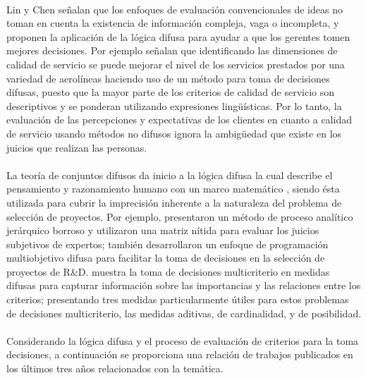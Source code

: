 \\
Lin y Chen señalan que los enfoques de evaluación convencionales de ideas no toman en cuenta la existencia de información compleja, vaga o incompleta, y proponen la aplicación de la lógica difusa para ayudar a que los gerentes tomen mejores decisiones. Por ejemplo \citet{saeida2015fuzzy} señalan que identificando las dimensiones de calidad de servicio se puede mejorar el nivel de los servicios prestados por una variedad de aerolíneas haciendo uso de un método para toma de decisiones difusas, puesto que la mayor parte de los criterios de calidad de servicio son descriptivos y se ponderan utilizando expresiones lingüísticas. Por lo tanto, la evaluación de las percepciones y expectativas de los clientes en cuanto a calidad de servicio usando métodos no difusos ignora la ambigüedad que existe en los juicios que realizan las personas.\\
\\
La teoría de conjuntos difusos \cite[]{zadeh1965fuzzy} da inicio a la lógica difusa la cual describe el pensamiento y razonamiento humano con un marco matemático \cite[]{Lameda2003fuzzy}, siendo ésta utilizada para cubrir la imprecisión inherente a la naturaleza del problema de selección de proyectos. Por ejemplo, \citet{huang2008fuzzy}	 presentaron un método de proceso analítico jerárquico borroso y utilizaron una matriz nítida para evaluar los juicios subjetivos de expertos; también \citet{bhattacharyya2011fuzzyRD} desarrollaron un enfoque de programación multiobjetivo difusa para facilitar la toma de decisiones en la selección de proyectos de R\&D. \citet{yager2014multicriteria} muestra la toma de decisiones multicriterio en medidas difusas para capturar información sobre las importancias y las relaciones entre los criterios; presentando tres medidas particularmente útiles para estos problemas  de decisiones multicriterio, las medidas  aditivas, de cardinalidad, y de posibilidad.\\ 
\\
Considerando la lógica difusa y el proceso de evaluación de criterios para la toma decisiones, a continuación se proporciona una relación de trabajos publicados en los últimos tres años relacionados con la temática. 

